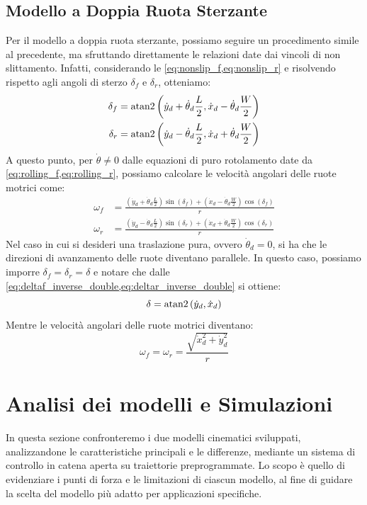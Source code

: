 \subsection{Modello a Doppia Ruota Sterzante}
Per il modello a doppia ruota sterzante, possiamo seguire un procedimento simile al precedente, ma sfruttando direttamente le relazioni date dai vincoli di non slittamento. Infatti, considerando le \cref{eq:nonslip_f,eq:nonslip_r} e risolvendo rispetto agli angoli di sterzo $\delta_f$ e $\delta_r$, otteniamo:
\begin{align}
    \delta_f & = \operatorname{atan2}\left(\dot{y}_d + \dot{\theta}_d \frac{L}{2},\dot{x}_d - \dot{\theta}_d \frac{W}{2}\right) \label{eq:deltaf_inverse_double} \\
    \delta_r & = \operatorname{atan2}\left(\dot{y}_d - \dot{\theta}_d \frac{L}{2},\dot{x}_d + \dot{\theta}_d \frac{W}{2}\right) \label{eq:deltar_inverse_double}
\end{align}
A questo punto, per $\dot{\theta}\neq0$ dalle equazioni di puro rotolamento date da \cref{eq:rolling_f,eq:rolling_r}, possiamo calcolare le velocità angolari delle ruote motrici come:
\begin{align}
    \omega_f & = \frac{(\dot{y}_d + \dot{\theta}_d \frac{L}{2}) \sin(\delta_f) + (\dot{x}_d - \dot{\theta}_d \frac{W}{2}) \cos(\delta_f)}{r} \label{eq:omegaf_inverse_double} \\
    \omega_r & = \frac{(\dot{y}_d - \dot{\theta}_d \frac{L}{2}) \sin(\delta_r) + (\dot{x}_d + \dot{\theta}_d \frac{W}{2}) \cos(\delta_r)}{r} \label{eq:omegar_inverse_double}
\end{align}
Nel caso in cui si desideri una traslazione pura, ovvero $\dot{\theta}_d = 0$, si ha che le direzioni di avanzamento delle ruote diventano parallele. In questo caso, possiamo imporre $\delta_f = \delta_r = \delta$ e notare che dalle \cref{eq:deltaf_inverse_double,eq:deltar_inverse_double} si ottiene:
\begin{equation}\label{eq:delta_inverse_double_parallel}
    \delta = \operatorname{atan2}\left(\dot{y}_d,\dot{x}_d\right)
\end{equation}
Mentre le velocità angolari delle ruote motrici diventano:
\begin{equation}\label{eq:omega_inverse_double_parallel}
    \omega_f = \omega_r = \frac{\sqrt{\dot{x}_d^2 + \dot{y}_d^2}}{r}
\end{equation}
\section{Analisi dei modelli e Simulazioni}
In questa sezione confronteremo i due modelli cinematici sviluppati, analizzandone le caratteristiche principali e le differenze, mediante un sistema di controllo in catena aperta su traiettorie preprogrammate. Lo scopo è quello di evidenziare i punti di forza e le limitazioni di ciascun modello, al fine di guidare la scelta del modello più adatto per applicazioni specifiche.

